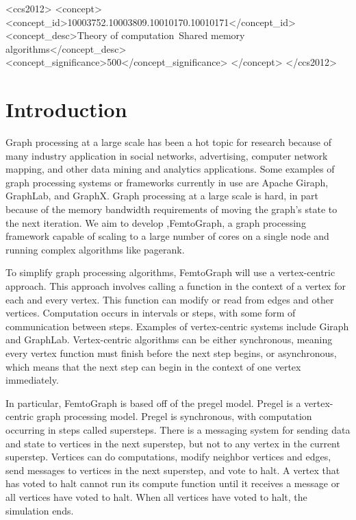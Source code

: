 \documentclass{sig-alternate-05-2015}
\begin{document}
%
\begin{CCSXML}
  <ccs2012>
  <concept>
  <concept_id>10003752.10003809.10010170.10010171</concept_id>
  <concept_desc>Theory of computation~Shared memory algorithms</concept_desc>
  <concept_significance>500</concept_significance>
  </concept>
  </ccs2012>
\end{CCSXML}

%
%

%
%
\printccsdesc



\section{Introduction}
Graph processing at a large scale has been a hot topic for research because of many industry application in social networks, advertising, computer network mapping, and other data mining and analytics applications. Some examples of graph processing systems or frameworks currently in use are Apache Giraph, GraphLab, and GraphX. Graph processing at a large scale is hard, in part because of the memory bandwidth requirements of moving the graph's state to the next iteration. \cite{Gz:7} We aim to develop ,FemtoGraph, a graph processing framework capable of scaling to a large number of cores on a single node and running complex algorithms like pagerank.

To simplify graph processing algorithms, FemtoGraph will use a vertex-centric approach. This approach involves calling a function in the context of a vertex for each and every vertex. This function can modify or read from edges and other vertices.  Computation occurs in intervals or steps, with some form of communication between steps. Examples of vertex-centric systems include Giraph and GraphLab. \cite{Gz:6} Vertex-centric algorithms can be either synchronous, meaning every vertex function must finish before the next step begins, or asynchronous, which means that the next step can begin in the context of one vertex immediately.

In particular, FemtoGraph is based off of the pregel model. Pregel is a vertex-centric graph processing model. Pregel is synchronous, with computation occurring in steps called supersteps. There is a messaging system for sending data and state to vertices in the next superstep, but not to any vertex in the current superstep. Vertices can do computations, modify neighbor vertices and edges, send messages to vertices in the next superstep, and vote to halt. A vertex that has voted to halt cannot run its compute function until it receives a message or all vertices have voted to halt. When all vertices have voted to halt, the simulation ends. \cite{Gz:4}
\end{document}
